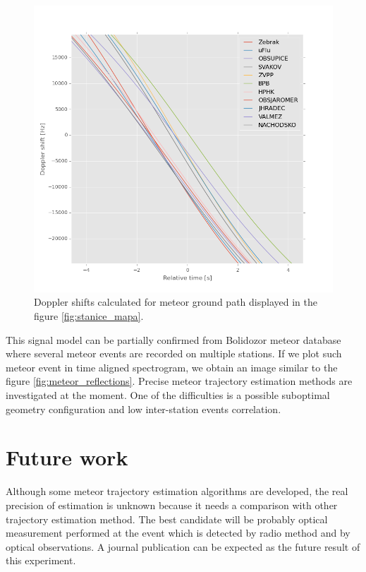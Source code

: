 \documentclass[twoside]{ctuthesis}
\theoremstyle{plain}
\theoremstyle{definition}
\theoremstyle{note}
\begin{document}
\begin{figure}
 \begin{center}
 \includegraphics[width=\textwidth]{./img/Meteor_dopplers.png}
 \caption{Doppler shifts calculated for meteor ground path displayed in the figure \ref{fig:stanice_mapa}.}
  \label{fig:dopplers} 
 \end{center}
\end{figure}


This signal model can be partially confirmed from Bolidozor meteor database where several meteor events are recorded on multiple stations. If we plot such meteor event in time aligned spectrogram, we obtain an image similar to the figure \ref{fig:meteor_reflections}.
Precise meteor trajectory estimation methods are investigated at the moment.  One of the difficulties is a possible suboptimal geometry configuration and low inter-station events correlation.


\chapter{Future work}

Although some meteor trajectory estimation algorithms are developed, the real precision of estimation is unknown because it needs a comparison with other trajectory estimation method. The best candidate will be probably optical measurement performed at the event which is detected by radio method and by optical observations. A journal publication can be expected as the future result of this experiment. 
\end{document}
